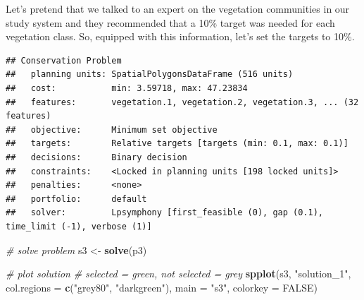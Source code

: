 \documentclass[12pt,]{book}
\newenvironment{Shaded}{\begin{snugshade}}{\end{snugshade}}
\newcommand{\KeywordTok}[1]{\textcolor[rgb]{0.13,0.29,0.53}{\textbf{#1}}}
\newcommand{\DataTypeTok}[1]{\textcolor[rgb]{0.13,0.29,0.53}{#1}}
\newcommand{\FloatTok}[1]{\textcolor[rgb]{0.00,0.00,0.81}{#1}}
\newcommand{\StringTok}[1]{\textcolor[rgb]{0.31,0.60,0.02}{#1}}
\newcommand{\CommentTok}[1]{\textcolor[rgb]{0.56,0.35,0.01}{\textit{#1}}}
\newcommand{\OtherTok}[1]{\textcolor[rgb]{0.56,0.35,0.01}{#1}}
\newcommand{\OperatorTok}[1]{\textcolor[rgb]{0.81,0.36,0.00}{\textbf{#1}}}
\newcommand{\NormalTok}[1]{#1}
\begin{document}
Let's pretend that we talked to an expert on the vegetation communities
in our study system and they recommended that a 10\% target was needed
for each vegetation class. So, equipped with this information, let's set
the targets to 10\%.

\begin{Shaded}
\end{Shaded}

\begin{verbatim}
## Conservation Problem
##   planning units: SpatialPolygonsDataFrame (516 units)
##   cost:           min: 3.59718, max: 47.23834
##   features:       vegetation.1, vegetation.2, vegetation.3, ... (32 features)
##   objective:      Minimum set objective 
##   targets:        Relative targets [targets (min: 0.1, max: 0.1)]
##   decisions:      Binary decision 
##   constraints:    <Locked in planning units [198 locked units]>
##   penalties:      <none>
##   portfolio:      default
##   solver:         Lpsymphony [first_feasible (0), gap (0.1), time_limit (-1), verbose (1)]
\end{verbatim}

\begin{Shaded}
\begin{Highlighting}[]
\CommentTok{# solve problem}
\NormalTok{s3 <-}\StringTok{ }\KeywordTok{solve}\NormalTok{(p3)}

\CommentTok{# plot solution}
\CommentTok{# selected = green, not selected = grey}
\KeywordTok{spplot}\NormalTok{(s3, }\StringTok{"solution_1"}\NormalTok{, }\DataTypeTok{col.regions =} \KeywordTok{c}\NormalTok{(}\StringTok{"grey80"}\NormalTok{, }\StringTok{"darkgreen"}\NormalTok{), }\DataTypeTok{main =} \StringTok{"s3"}\NormalTok{,}
       \DataTypeTok{colorkey =} \OtherTok{FALSE}\NormalTok{)}
\end{Highlighting}
\end{Shaded}
\end{document}
